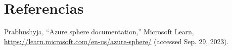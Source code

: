 \section{Referencias}
Prabhushyja, “Azure sphere documentation,” Microsoft Learn, \href{https://learn.microsoft.com/en-us/azure-sphere/}{https://learn.microsoft.com/en-us/azure-sphere/} (accessed Sep. 29, 2023). 